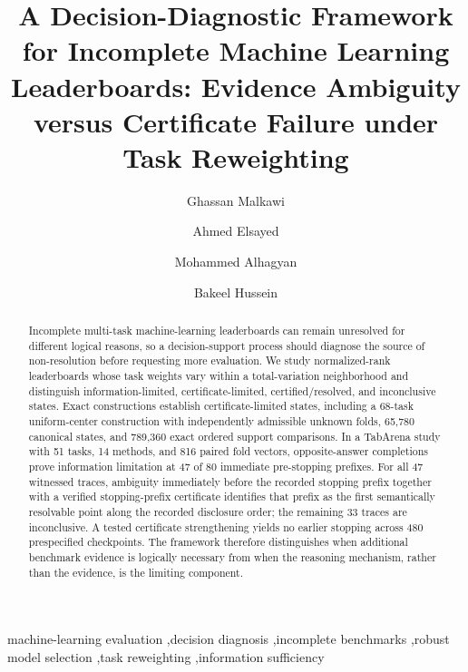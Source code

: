 \documentclass[preprint,11pt]{elsarticle}
\begin{document}
\begin{frontmatter}
\title{A Decision-Diagnostic Framework for Incomplete Machine Learning Leaderboards: Evidence Ambiguity versus Certificate Failure under Task Reweighting}

\author[hct]{Ghassan Malkawi}
\author[cud]{Ahmed Elsayed}
\author[uaeu]{Mohammed Alhagyan}
\author[scc]{Bakeel Hussein}


\begin{abstract}
Incomplete multi-task machine-learning leaderboards can remain unresolved for different logical reasons, so a decision-support process should diagnose the source of non-resolution before requesting more evaluation. We study normalized-rank leaderboards whose task weights vary within a total-variation neighborhood and distinguish information-limited, certificate-limited, certified/resolved, and inconclusive states. Exact constructions establish certificate-limited states, including a 68-task uniform-center construction with independently admissible unknown folds, 65,780 canonical states, and 789,360 exact ordered support comparisons. In a TabArena study with 51 tasks, 14 methods, and 816 paired fold vectors, opposite-answer completions prove information limitation at 47 of 80 immediate pre-stopping prefixes. For all 47 witnessed traces, ambiguity immediately before the recorded stopping prefix together with a verified stopping-prefix certificate identifies that prefix as the first semantically resolvable point along the recorded disclosure order; the remaining 33 traces are inconclusive. A tested certificate strengthening yields no earlier stopping across 480 prespecified checkpoints. The framework therefore distinguishes when additional benchmark evidence is logically necessary from when the reasoning mechanism, rather than the evidence, is the limiting component.
\end{abstract}

\begin{keyword}
machine-learning evaluation \sep decision diagnosis \sep incomplete benchmarks \sep robust model selection \sep task reweighting \sep information sufficiency
\end{keyword}
\end{frontmatter}
\end{document}
